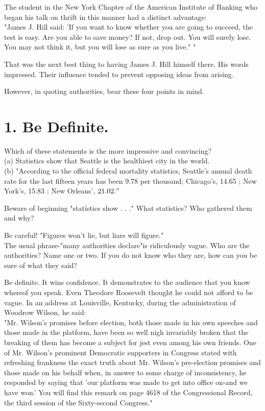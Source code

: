 \documentclass[10pt]{article}
\begin{document}
The student in the New York Chapter of the American Institute of Banking who began his talk on thrift in this manner had a distinct advantage:\\
"James J. Hill said: 'If you want to know whether you are going to succeed, the test is easy. Are you able to save money? If not, drop out. You will surely lose. You may not think it, but you will lose as sure as you live." "

That was the next best thing to having James J. Hill himself there. His words impressed. Their influence tended to prevent opposing ideas from arising.

However, in quoting authorities, bear these four points in mind.

\section*{1. Be Definite.}
Which of these statements is the more impressive and convincing?\\
(a) Statistics show that Seattle is the healthiest city in the world.\\
(b) "According to the official federal mortality statistics, Seattle's annual death rate for the last fifteen years has been 9.78 per thousand; Chicago's, 14.65 ; New York's, 15.83 ; New Orleans', $21.02 . "$

Beware of beginning "statístics show . . ." What statistics? Who gathered them and why?

Be careful! "Figures won't lie, but liars will figure."\\
The usual phrase-"many authorities declare"is ridiculously vague. Who are the authorities? Name one or two. If you do not know who they are, how can you be sure of what they said?

Be definite. It wins confidence. It demonstrates to the audience that you know whereof you speak. Even Theodore Roosevelt thought he could not afford to be vague. In an address at Louisville, Kentucky, during the administration of Woodrow Wilson, he said:\\
"Mr. Wilson's promises before election, both those made in his own speeches and those made in the platform, have been so well nigh invariably broken that the breaking of them has become a subject for jest even among his own friends. One of Mr. Wilson's prominent Democratic supporters in Congress stated with refreshing frankness the exact truth about Mr. Wilson's pre-election promises and those made on his behalf when, in answer to some charge of inconsistency, he responded by saying that 'our platform was made to get into office on-and we have won.' You will find this remark on page 4618 of the Congressional Record, the third session of the Sixty-second Congress."
\end{document}
